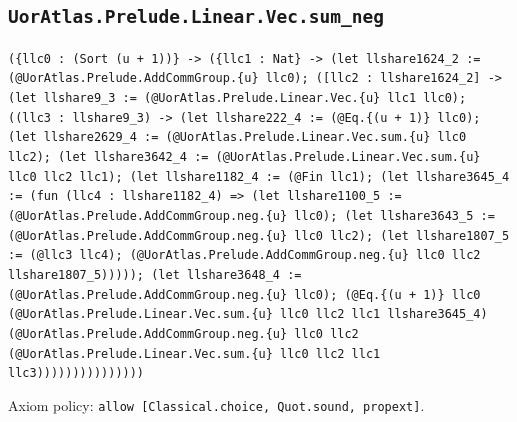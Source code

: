 \documentclass[11pt]{article}
\begin{document}
\subsection*{\texttt{UorAtlas.Prelude.Linear.Vec.sum\_neg}}
\noindent\texttt{(\{llc0 : (Sort (u + 1))\} -> (\{llc1 : Nat\} -> (let llshare1624\_2 := (@UorAtlas.Prelude.AddCommGroup.\{u\} llc0); ([llc2 : llshare1624\_2] -> (let llshare9\_3 := (@UorAtlas.Prelude.Linear.Vec.\{u\} llc1 llc0); ((llc3 : llshare9\_3) -> (let llshare222\_4 := (@Eq.\{(u + 1)\} llc0); (let llshare2629\_4 := (@UorAtlas.Prelude.Linear.Vec.sum.\{u\} llc0 llc2); (let llshare3642\_4 := (@UorAtlas.Prelude.Linear.Vec.sum.\{u\} llc0 llc2 llc1); (let llshare1182\_4 := (@Fin llc1); (let llshare3645\_4 := (fun (llc4 : llshare1182\_4) => (let llshare1100\_5 := (@UorAtlas.Prelude.AddCommGroup.neg.\{u\} llc0); (let llshare3643\_5 := (@UorAtlas.Prelude.AddCommGroup.neg.\{u\} llc0 llc2); (let llshare1807\_5 := (@llc3 llc4); (@UorAtlas.Prelude.AddCommGroup.neg.\{u\} llc0 llc2 llshare1807\_5))))); (let llshare3648\_4 := (@UorAtlas.Prelude.AddCommGroup.neg.\{u\} llc0); (@Eq.\{(u + 1)\} llc0 (@UorAtlas.Prelude.Linear.Vec.sum.\{u\} llc0 llc2 llc1 llshare3645\_4) (@UorAtlas.Prelude.AddCommGroup.neg.\{u\} llc0 llc2 (@UorAtlas.Prelude.Linear.Vec.sum.\{u\} llc0 llc2 llc1 llc3)))))))))))))))}\par
\noindent Axiom policy: \texttt{allow [Classical.choice, Quot.sound, propext]}.\par
\end{document}
